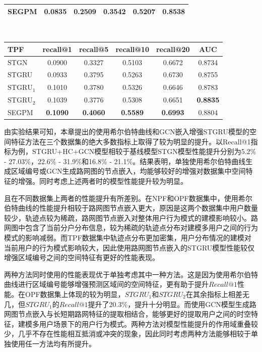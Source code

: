 \documentclass[master]{thesis-uestc}
\begin{document}
\begin{table}[!ht]
{\begin{tabular}{lccccc}
SEGPM&\textbf{0.0835}&\textbf{0.2509}&\textbf{0.3542}&\textbf{0.5207}&0.8538\\
\bottomrule[1.5pt]
\end{tabular}
\\
\centering
\begin{tabular}{lccccc}
\toprule[1.5pt]  %
\textbf{TPF}  & recall@1 & recall@5 & recall@10 & recall@20 & AUC\\
\midrule[0.75pt]
STGN    & 0.0900 & 0.3327 & 0.5103 & 0.6672 & 0.8734 \\

STGRU   & 0.0933 & 0.3795 & 0.5263 & 0.6730 & 0.8755 \\

$\mathrm{STGRU}_1$& 0.1010   & 0.3780   & 0.5326    & 0.6646    & 0.8783 \\

$\mathrm{STGRU}_2$& 0.1039   & 0.3776   & 0.5308    & 0.6651    & \textbf{0.8835} \\

SEGPM&\textbf{0.1090}&\textbf{0.4060}&\textbf{0.5589}&\textbf{0.6993}&0.8804\\
\bottomrule[1.5pt]
\end{tabular}}
\end{table}

由实验结果可知，本章提出的使用希尔伯特曲线和GCN嵌入增强STGRU模型的空间特征方法在三个数据集的绝大多数指标上取得了较为明显的提升。以Recall@1指标为例，STGRU+HC+GCN模型相较于基线模型STGN模型性能提升分别为5.2$\%$ - 27.03$\%$，22.6$\%$ - 31.9$\%$和16.8$\%$ - 21.1$\%$。结果表明，单独使用希尔伯特曲线生成区域编号或GCN生成路网图的节点嵌入，均能够较好的增强对数据集中空间特征的增强。同时考虑上述两者时的模型性能提升较为明显。

且在不同数据集上两者的性能提升有所差别。在NPF和OPF数据集中，使用希尔伯特曲线的性能提升相较于路网图节点嵌入更大，原因是这两个数据集中用户数量较少，轨迹点较为稀疏，路网图节点嵌入对整体用户行为模式的建模影响较小。路网图中包含了当前分户分布信息，较为稀疏的轨迹点分布对建模多用户之间的行为模式的影响减弱。而TPF数据集中轨迹点分布更加密集，用户分布情况的建模对当前用户的行为模式影响较大，因此使用路网图节点嵌入的STGRU模型性能较仅增强区域编号之间的空间特征有更好的性能表现。

两种方法同时使用的性能表现优于单独考虑其中一种方法。这是因为使用希尔伯特曲线进行区域编号能够增强预测区域间的空间特征，更有助于提升$Recall@1$性能。在OPF数据集上体现的较为明显，$STGRU_1$和$STGRU_2$在其余指标上相差无几，但$STGRU_1$的$Recall@1$提升了20.3$\%$，提升十分明显。而使用GCN模型生成路网图节点嵌入与长短期路网特征的提取相结合，能够更好的提取用户之间的时空特征，建模多用户场景下的用户行为模式。两种方法对模型性能提升的作用域重叠较少，几乎不存在性能相互抵消或冲突的现象，因此同时考虑两种方法能够相较于单独使用任一方法均有所提升。
\end{document}

